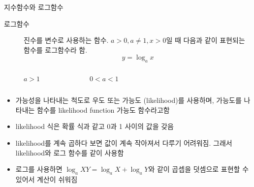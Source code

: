 \documentclass[10pt,t]{beamer}
\begin{document}
\begin{frame}{지수함수와 로그함수}
\begin{description}
    \item[로그함수] 진수를 변수로 사용하는 함수. $a>0, a\neq 1, x > 0$일 때 다음과 같이 표현되는 함수를 로그함수라 함. \\
    \begin{equation*}
        y=\log_a x
    \end{equation*}  
\end{description}
\begin{columns}
    \vspace{-1em}
    \begin{figure}
        \caption{$a>1$}
    \end{figure}
    \vspace{-1em}
    \begin{figure}
        \caption{$0<a<1$}
    \end{figure}
    
\end{columns}
\pagebreak

\begin{itemize}
    \item 가능성을 나타내는 척도로 우도 또는 가능도 (likelihood)를 사용하며, 가능도를 나타내는 함수를 likelihood function 가능도 함수라고함
    \item likelihood 식은 확률 식과 같고 0과 1 사이의 값을 갖음
    \item likelihood를 계속 곱하다 보면 값이 계속 작아져서 다루기 어려워짐. 그래서 likelihood와 로그 함수를 같이 사용함
    \item 로그를 사용하면 $\log_a XY = \log_a X + \log_a Y$와 같이 곱셉을 덧셈으로 표현할 수 있어서 계산이 쉬워짐
\end{itemize}
\end{frame}
    
\end{document}
